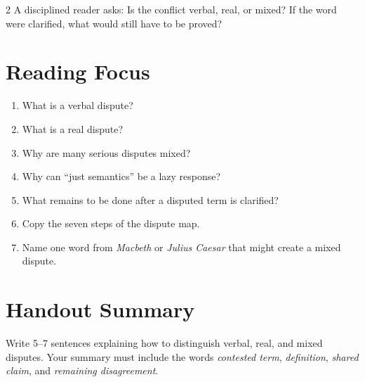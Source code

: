 \documentclass[12pt]{article}
\begin{document}
\begin{multicols}{2}
A disciplined reader asks: Is the conflict verbal, real, or mixed? If the word were clarified, what would still have to be proved?

\section*{Reading Focus}
\begin{enumerate}[leftmargin=*]
\item What is a verbal dispute?
\item What is a real dispute?
\item Why are many serious disputes mixed?
\item Why can ``just semantics'' be a lazy response?
\item What remains to be done after a disputed term is clarified?
\item Copy the seven steps of the dispute map.
\item Name one word from \textit{Macbeth} or \textit{Julius Caesar} that might create a mixed dispute.
\end{enumerate}

\section*{Handout Summary}
Write 5--7 sentences explaining how to distinguish verbal, real, and mixed disputes. Your summary must include the words \textit{contested term}, \textit{definition}, \textit{shared claim}, and \textit{remaining disagreement}.
\end{multicols}
\end{document}
